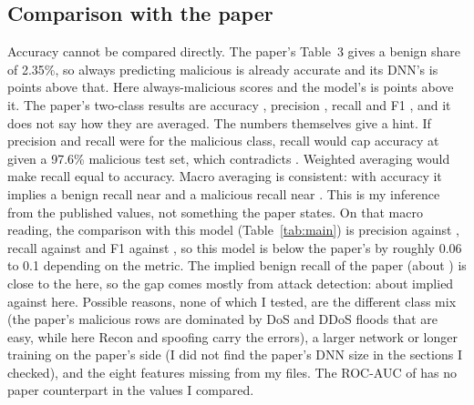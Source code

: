\documentclass[conference]{IEEEtran}
\begin{document}
\subsection{Comparison with the paper}
Accuracy cannot be compared directly. The paper's Table~3 gives a benign share of 2.35\%, so always predicting malicious is already \PaperMajority{} accurate and its DNN's \PaperAcc{} is \PaperMargin{} points above that. Here always-malicious scores \MainMajority{} and the model's \MainAcc{} is \OurMargin{} points above it. The paper's two-class results are accuracy \PaperAcc{}, precision \PaperPrec{}, recall \PaperRec{} and F1 \PaperFOne{}, and it does not say how they are averaged. The numbers themselves give a hint. If precision and recall were for the malicious class, recall \PaperRec{} would cap accuracy at \PaperMalPosAccBound{} given a 97.6\% malicious test set, which contradicts \PaperAcc{}. Weighted averaging would make recall equal to accuracy. Macro averaging is consistent: with accuracy \PaperAcc{} it implies a benign recall near \PaperImpliedBenignRec{} and a malicious recall near \PaperImpliedMalRec{}. This is my inference from the published values, not something the paper states. On that macro reading, the comparison with this model (Table~\ref{tab:main}) is precision \MainMacroPrec{} against \PaperPrec{}, recall \MainMacroRec{} against \PaperRec{} and F1 \MainMacroFOne{} against \PaperFOne{}, so this model is below the paper's by roughly 0.06 to 0.1 depending on the metric. The implied benign recall of the paper (about \PaperImpliedBenignRec{}) is close to the \MainBenignRec{} here, so the gap comes mostly from attack detection: about \PaperImpliedMalRec{} implied against \MainRec{} here. Possible reasons, none of which I tested, are the different class mix (the paper's malicious rows are dominated by DoS and DDoS floods that are easy, while here Recon and spoofing carry the errors), a larger network or longer training on the paper's side (I did not find the paper's DNN size in the sections I checked), and the eight features missing from my files. The ROC-AUC of \MainAuc{} has no paper counterpart in the values I compared.
\end{document}
